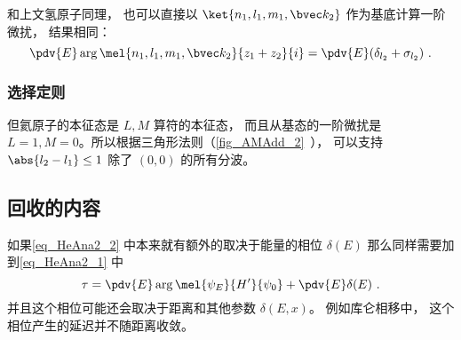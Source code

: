 和上文氢原子同理， 也可以直接以 $\ket{n_1, l_1, m_1, \bvec k_2}$ 作为基底计算一阶微扰， 结果相同：
\begin{equation}
\pdv{E} \arg\mel{n_1, l_1, m_1, \bvec k_2}{z_1 + z_2}{i} = \pdv{E} (\delta_{l_2} + \sigma_{l_2})~.
\end{equation}

\subsubsection{选择定则}
但氦原子的本征态是 $L,M$ 算符的本征态， 而且从基态的一阶微扰是 $L = 1, M = 0$。所以根据三角形法则（\autoref{fig_AMAdd_2}~）， 可以支持 $\abs{l_2 - l_1} \le 1$ 除了 $(0,0)$ 的所有分波。

\subsection{回收的内容}

如果\autoref{eq_HeAna2_2} 中本来就有额外的取决于能量的相位 $\delta(E)$ 那么同样需要加到\autoref{eq_HeAna2_1} 中
\begin{equation}
\tau = \pdv{E} \arg \mel{\psi_E}{H'}{\psi_0} + \pdv{E} \delta(E)~.
\end{equation}
并且这个相位可能还会取决于距离和其他参数 $\delta(E, x)$。 例如库仑相移中， 这个相位产生的延迟并不随距离收敛。

